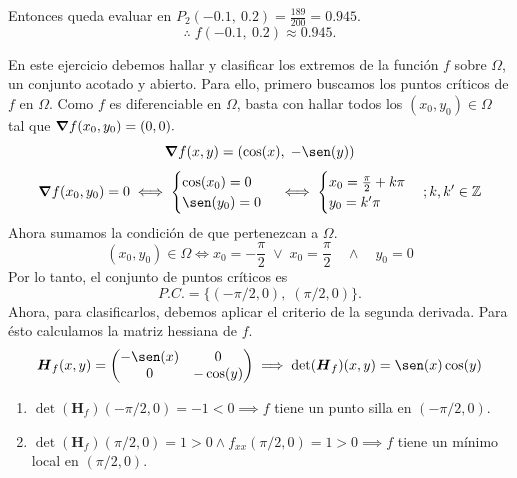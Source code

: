 \begin{solution}
    Entonces queda evaluar en $P_2\left(-0\text{.}1,\:0\text{.}2\right) = \frac{189}{200} = 0\text{.}945$.
    $$\therefore\;f\left(-0\text{.}1,\:0\text{.}2\right)\approx0\text{.}945.$$
\end{solution}

\begin{solution}
    En este ejercicio debemos hallar y clasificar los extremos de la función $f$ sobre $\Omega$,  un conjunto acotado y abierto.
    Para ello,    primero buscamos los puntos críticos de $f$ en $\Omega$. Como $f$ es diferenciable en  $\Omega$, basta con hallar todos los $(x_0,y_0) \in  \Omega$ tal que $\grad f(x_0,y_0)=(0,0).$
    \[
        \grad f(x,y)=\left(\cos(x),\;-\sen(y)\right)
    \]
    \[
        \grad f(x_0,y_0) =0 \iff \begin{cases}
            \cos(x_0)=0 \\ \sen(y_0)=0
        \end{cases} \iff \begin{cases}
            x_0 = \frac{\pi}{2}+k\pi \\
            y_0 = k'\pi
        \end{cases};k,k'\in\mathbb{Z}
    \]
    Ahora sumamos la condición de que pertenezcan a $\Omega$.
    \[
        (x_0,y_0)\in\Omega\iff x_0=-\frac{\pi}{2}\;\lor\;x_0=\frac{\pi}{2}\quad\land\quad y_0=0
    \]
    Por lo tanto,  el conjunto de puntos críticos es
    \[
        P.C.=\{(-\pi/2,0),\;(\pi/2,0)\}.
    \]
    Ahora, para clasificarlos, debemos aplicar el criterio de la segunda derivada. Para ésto calculamos la matriz hessiana de $f$.
    \[
        \boldsymbol{H}_f(x,y)=\left(\begin{matrix}
                -\sen(x) & 0 \\ 0 & -\cos(y)
            \end{matrix}\right)\implies \text{det}(\boldsymbol{H}_f)(x,y)=\sen(x)\cos(y)
    \]

    \begin{enumerate}
    \item $\det(\boldsymbol{H}_f)(-\pi/2,0) = -1 < 0 \implies f$ tiene un punto silla en $(-\pi/2,0)$.
    
    \item $\det(\boldsymbol{H}_f)(\pi/2,0) = 1 > 0 \land f_{xx}(\pi/2,0) = 1 > 0 \implies f$ tiene un mínimo local en $(\pi/2,0)$.
    \end{enumerate}
\end{solution}
